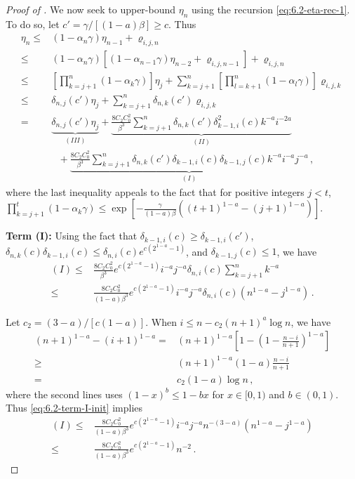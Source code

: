 \documentclass[11pt]{article}
\theoremstyle{plain}
\begin{document}
\begin{proof}[Proof of ]
We now seek to upper-bound $\eta_n$ using the recursion \eqref{eq:6.2-eta-rec-1}. To do so, let $c'=\gamma/[(1-a)\beta]\ge c$. Thus
\begin{align}
\eta_n \le & (1-\alpha_{n}\gamma)\eta_{n-1}+\varrho_{i,j,n}\nonumber\\
\le & (1-\alpha_{n}\gamma)\left[(1-\alpha_{n-1}\gamma)\eta_{n-2}+\varrho_{i,j,n-1}\right]+\varrho_{i,j,n}\nonumber\\
\le & \left[\prod_{k=j+1}^n(1-\alpha_k\gamma)\right] \eta_j + \sum_{k=j+1}^{n} \left[\prod_{l=k+1}^n(1-\alpha_l\gamma)\right] \varrho_{i,j,k}\nonumber\\
\le & \delta_{n,j}(c')\eta_j+
\sum_{k=j+1}^{n} \delta_{n,k}(c')\varrho_{i,j,k}\nonumber\\
=& \underbrace{\delta_{n,j}(c')\eta_j}_{(III)}+
\underbrace{\frac{8C_2C_0^2}{\beta^3}\sum_{k=j+1}^{n} \delta_{n,k}(c')\delta_{k-1,i}^2(c) k^{-a}i^{-2a}}_{(II)}\nonumber\\
&~~~+\underbrace{\frac{8C_2C_0^2}{\beta^3}\sum_{k=j+1}^{n} \delta_{n,k}(c')\delta_{k-1,i}(c)\delta_{k-1,j}(c) k^{-a}i^{-a}j^{-a}}_{(I)}\,,\label{eq:6.2-eta-rec-3}
\end{align}
where the last inequality appeals to the fact that for positive integers $j<t$, $\prod_{k=j+1}^t (1-\alpha_k \gamma)\le \exp\left[-\frac{\gamma}{(1-a)\beta}\left((t+1)^{1-a}-(j+1)^{1-a}\right)\right]$.

\textbf{Term (I):} Using the fact that $\delta_{k-1,i}(c)\ge \delta_{k-1,i}(c')$, $\delta_{n,k}(c)\delta_{k-1,i}(c)\le \delta_{n,i}(c)e^{c(2^{1-a}-1)}$, and $\delta_{k-1,j}(c)\le 1$, we have
\begin{align}
    (I)\le & \frac{8C_2C_0^2}{\beta^3}e^{c(2^{1-a}-1)}i^{-a}j^{-a}\delta_{n,i}(c)\sum_{k=j+1}^n k^{-a}\nonumber\\
    \le & \frac{8C_2C_0^2}{(1-a)\beta^3}e^{c(2^{1-a}-1)}i^{-a}j^{-a}\delta_{n,i}(c)(n^{1-a}-j^{1-a})\,.\label{eq:6.2-term-I-init}
\end{align}


Let $c_2=(3-a)/[c(1-a)]$.
When $i\le n-c_2 (n+1)^a \log n$, we have
\begin{align*}
  (n+1)^{1-a}-(i+1)^{1-a} = & (n+1)^{1-a}\left[1-\left(1-\frac{n-i}{n+1}\right)^{1-a}\right]\\
  \ge & (n+1)^{1-a}(1-a)\frac{n-i}{n+1}\\
  = & c_2(1-a) \log n\,,
\end{align*}
where the second lines uses $(1-x)^b\le 1-bx$ for $x\in[0,1)$ and $b\in(0,1)$. Thus 
\eqref{eq:6.2-term-I-init} implies
\begin{align}
   (I)\le & \frac{8 C_2C_0^2 }{(1-a)\beta^3}e^{c(2^{1-a}-1)}i^{-a}j^{-a}n^{-(3-a)}(n^{1-a}-j^{1-a})\nonumber \\
    \le & \frac{8 C_2C_0^2 }{(1-a)\beta^3}e^{c(2^{1-a}-1)} n^{-2}\,.  \label{eq:6.2-term-I-small-i}
\end{align}


\end{proof}
\end{document}
